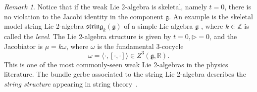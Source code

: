 \documentclass[onecolumn]{article}
\theoremstyle{theorem}
\theoremstyle{remark}
\newtheorem{remark}{Remark}[section]
\theoremstyle{example}
\theoremstyle{definition}
\numberwithin{equation}{section}
\def\ker{\operatorname{ker}}
\def\g{\mathfrak g}
\def\bbZ{\mathbb{Z}}
\begin{document}
\begin{remark}\label{rem:string}
Notice that if the weak Lie 2-algebra is skeletal, namely $t= 0$, there is no violation to the Jacobi identity in the component $\g$. An example is the skeletal model { {string Lie 2-algebra}} $\mathfrak{string}_k(\mathfrak{g})$ of a simple Lie algebra $\g$ \cite{Kim:2019owc,Baez:2005sn}, where $k\in\bbZ$ is called the {\it level}. The Lie 2-algebra structure is given by $t=0,\rhd=0$, and the Jacobiator is $\mu = k\omega$, where $\omega$ is the fundamental 3-cocycle
\begin{equation}
    \omega = \langle\cdot,[\cdot,\cdot]\rangle \in Z^3(\mathfrak{g},\mathbb{R}).\nonumber
\end{equation}
{This} is one of the most commonly-seen weak Lie 2-algebras in the physics literature. The bundle gerbe associated to the string Lie 2-algebra describes the \textit{string structure} appearing in string theory~\cite{Carey:2005,Sati:2009ic}.
\end{remark}




\end{document}
